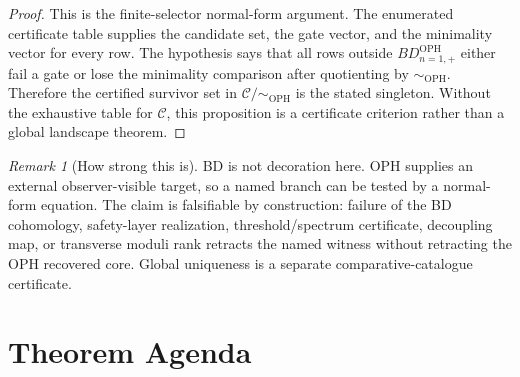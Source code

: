 \documentclass[11pt]{article}
\theoremstyle{remark}
\newtheorem{remark}[theorem]{Remark}
\theoremstyle{plain}
\newcommand{\OPH}{\mathrm{OPH}}
\newcommand{\Teq}{\sim_{\OPH}}
\begin{document}
\begin{proof}
This is the finite-selector normal-form argument. The enumerated certificate table supplies the
candidate set, the gate vector, and the minimality vector for every row. The hypothesis says that
all rows outside \(BD_{n=1,+}^{\OPH}\) either fail a gate or lose the minimality comparison after
quotienting by \(\Teq\). Therefore the certified survivor set in \(\mathcal C/\Teq\) is the stated
singleton. Without the exhaustive table for \(\mathcal C\), this proposition is a certificate
criterion rather than a global landscape theorem.
\end{proof}

\begin{remark}[How strong this is]
BD is not decoration here. OPH supplies an external observer-visible target, so a named branch can
be tested by a normal-form equation. The claim is falsifiable by construction: failure of the BD
cohomology, safety-layer realization, threshold/spectrum certificate, decoupling map, or transverse
moduli rank retracts the
named witness without retracting the OPH recovered core. Global uniqueness is a separate
comparative-catalogue certificate.
\end{remark}

\section{Theorem Agenda}
\end{document}
